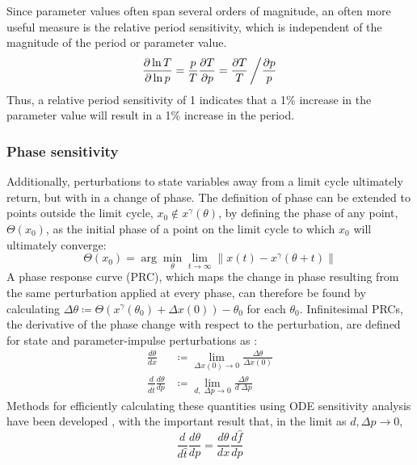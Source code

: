 Since parameter values often span several orders of magnitude, an often more useful measure is the relative period sensitivity, which is independent of the magnitude of the period or parameter value.
\begin{equation}
  \frac{\partial \ln T}{\partial \ln p} = \frac{p}{T}\frac{\partial T}{\partial p} = \frac{\partial T}{T} \left/ \frac{\partial p}{p} \right.
\end{equation}
Thus, a relative period sensitivity of 1 indicates that a 1\% increase in the parameter value will result in a 1\% increase in the period.

\subsubsection{Phase sensitivity}

Additionally, perturbations to state variables away from a limit cycle ultimately return, but with in a change of phase.
The definition of phase can be extended to points outside the limit cycle, $x_0 \not\in x^\gamma(\theta)$, by defining the phase of any point, $\Theta(x_0)$, as the initial phase of a point on the limit cycle to which $x_0$ will ultimately converge:
\begin{equation}
  \Theta(x_0) = \arg\min_\theta \lim_{t \to \infty} \lVert x(t)
  - x^\gamma(\theta + t)\rVert
  \label{eq:extendedphase2}
\end{equation}
A phase response curve (PRC), which maps the change in phase resulting from the same
perturbation applied at every phase, can therefore be found by calculating $
\Delta\theta \coloneqq \Theta(x^\gamma(\theta_0) + \Delta x(0)) - \theta_0$ for each
$\theta_0$. Infinitesimal PRCs, the derivative of the phase
change with respect to the perturbation, are defined for state and
parameter-impulse perturbations as \cite{Taylor2008a}:
\begin{align}
  \frac{d\theta}{dx} &\coloneqq \lim_{\Delta x(0) \to 0} \frac{\Delta\theta}{\Delta
  x(0)} \label{eq:sPRC}\\
  \frac{d}{d\hat{t}}\frac{d\theta}{dp} &\coloneqq \lim_{d,\; \Delta p \to 0}
  \frac{\Delta\theta}{d \; \Delta p}
  \label{eq:PRC}
\end{align}
Methods for efficiently calculating these quantities using ODE sensitivity
analysis have been developed \cite{Taylor2008a}, with the important result
that, in the limit as $d, \Delta p \to 0$, 
\begin{equation}
  \frac{d}{d\hat{t}}\frac{d\theta}{dp} = \frac{d\theta}{dx}\frac{d\hat{f}}{dp} 
  \label{eq:pPRCequiv}
\end{equation}

